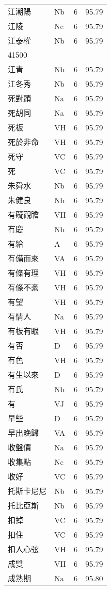 \documentclass[twocolumn]{book}
\begin{document}
\begin{supertabular}{llrr}
江潮陽 & Nb & 6 &  95.79\\
江陵 & Nc & 6 &  95.79\\
江泰權 & Nb & 6 &  95.79\\
41500\\
江青 & Nb & 6 &  95.79\\
江冬秀 & Nb & 6 &  95.79\\
死對頭 & Na & 6 &  95.79\\
死胡同 & Na & 6 &  95.79\\
死板 & VH & 6 &  95.79\\
死於非命 & VH & 6 &  95.79\\
死守 & VC & 6 &  95.79\\
死 & VC & 6 &  95.79\\
朱舜水 & Nb & 6 &  95.79\\
朱健良 & Nb & 6 &  95.79\\
有礙觀瞻 & VH & 6 &  95.79\\
有慶 & Nb & 6 &  95.79\\
有給 & A & 6 &  95.79\\
有備而來 & VA & 6 &  95.79\\
有條有理 & VH & 6 &  95.79\\
有條不紊 & VH & 6 &  95.79\\
有望 & VH & 6 &  95.79\\
有情人 & Na & 6 &  95.79\\
有板有眼 & VH & 6 &  95.79\\
有否 & D & 6 &  95.79\\
有色 & VH & 6 &  95.79\\
有生以來 & D & 6 &  95.79\\
有氏 & Nb & 6 &  95.79\\
有 & VJ & 6 &  95.79\\
早些 & D & 6 &  95.79\\
早出晚歸 & VA & 6 &  95.79\\
收盤價 & Na & 6 &  95.79\\
收集點 & Nc & 6 &  95.79\\
收好 & VC & 6 &  95.79\\
托斯卡尼尼 & Nb & 6 &  95.79\\
托比亞斯 & Nb & 6 &  95.79\\
扣掉 & VC & 6 &  95.79\\
扣住 & VC & 6 &  95.79\\
扣人心弦 & VH & 6 &  95.79\\
成雙 & VH & 6 &  95.79\\
成熟期 & Na & 6 &  95.80\\

\end{supertabular}
\end{document}
